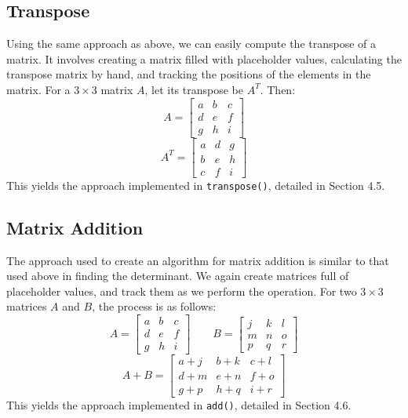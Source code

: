 \documentclass[12pt]{article}
\begin{document}
\subsection{Transpose}
Using the same approach as above, we can easily compute the transpose of a matrix. It involves creating a matrix filled with placeholder values, calculating the transpose matrix by hand, and tracking the positions of the elements in the matrix. For a $3\times3$ matrix $A$, let its transpose be $A^T$. Then:
\[
A =
\begin{bmatrix}
    a & b & c \\
    d & e & f \\
    g & h & i
\end{bmatrix}
\]
\begin{equation}
A^T =
    \begin{bmatrix}
    a & d & g \\
    b & e & h \\
    c & f & i
\end{bmatrix}
\end{equation}
This yields the approach implemented in \texttt{transpose()}, detailed in Section 4.5.

\subsection{Matrix Addition}
The approach used to create an algorithm for matrix addition is similar to that used above in finding the determinant. We again create matrices full of placeholder values, and track them as we perform the operation. For two $3\times3$ matrices $A$ and $B$, the process is as follows:
\[
A =
\begin{bmatrix}
    a & b & c \\
    d & e & f \\
    g & h & i
\end{bmatrix}
\qquad
B = 
\begin{bmatrix}
    j & k & l \\
    m & n & o \\
    p & q & r
\end{bmatrix}
\]
\begin{equation}
    A+B = 
    \begin{bmatrix}
    a + j & b + k & c + l \\
    d + m & e + n & f + o \\
    g + p & h + q & i + r
    \end{bmatrix}
\end{equation}
This yields the approach implemented in \texttt{add()}, detailed in Section 4.6.
\end{document}
